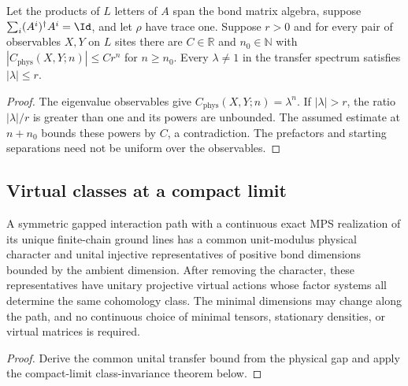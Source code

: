 \begin{lemma}
    \label{lem:spt_transfer_rate_from_correlations}
    \leanok
    Let the products of $L$ letters of $A$ span the bond matrix algebra,
    suppose $\sum_i(A^i)^\dagger A^i=\Id$, and let $\rho$ have trace one.
    Suppose $r>0$ and for every pair of observables $X,Y$ on $L$ sites
    there are $C\in\mathbb R$ and $n_0\in\mathbb N$ with
    $|C_{\mathrm{phys}}(X,Y;n)|\leq Cr^n$ for $n\geq n_0$.
    Every $\lambda\ne1$ in the transfer spectrum satisfies $|\lambda|\leq r$.
\end{lemma}
\begin{proof}\leanok
    The eigenvalue observables give $C_{\mathrm{phys}}(X,Y;n)=\lambda^n$. If
    $|\lambda|>r$, the ratio $|\lambda|/r$ is greater than one and its
    powers are unbounded. The assumed estimate at $n+n_0$ bounds these
    powers by $C$, a contradiction. The prefactors and starting
    separations need not be uniform over the observables.
\end{proof}

\subsection{Virtual classes at a compact limit}

\begin{theorem}
    \label{thm:spt_exact_ground_physical_class}
    \leanok
    A symmetric gapped interaction path with a continuous exact MPS
    realization of its unique finite-chain ground lines has a common
    unit-modulus physical character and unital injective representatives
    of positive bond dimensions bounded by the ambient dimension.
    After removing the character, these representatives have unitary
    projective virtual actions whose factor systems all determine the
    same cohomology class. The minimal dimensions may change along the
    path, and no continuous choice of minimal tensors, stationary
    densities, or virtual matrices is required.
\end{theorem}
\begin{proof}\leanok
    Derive the common unital transfer bound from the physical gap and
    apply the compact-limit class-invariance theorem below.
\end{proof}

